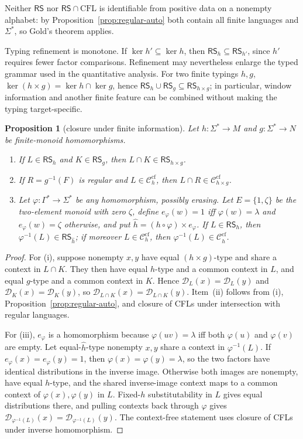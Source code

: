 \documentclass[11pt,a4paper]{article}
\newtheorem{proposition}[theorem]{Proposition}
\theoremstyle{remark}
\theoremstyle{plain}
\newcommand{\D}{\mathcal{D}}
\newcommand{\cf}{\mathrm{cf}}
\newcommand{\Ccf}[1]{\mathcal C_{#1}^{\cf}}
\begin{document}
Neither $\mathsf{RS}$ nor $\mathsf{RS}\cap\mathrm{CFL}$ is identifiable
from positive data on a nonempty alphabet: by
Proposition~\ref{prop:regular-auto} both contain all finite languages and
$\Sigma^*$, so Gold's theorem applies.

Typing refinement is monotone.  If $\ker h'\subseteq\ker h$, then
$\mathsf{RS}_h\subseteq\mathsf{RS}_{h'}$, since $h'$ requires fewer
factor comparisons.  Refinement may nevertheless enlarge the typed grammar
used in the quantitative analysis.  For two finite typings $h,g$,
$\ker(h\times g)=\ker h\cap\ker g$, hence
$\mathsf{RS}_h\cup\mathsf{RS}_g\subseteq\mathsf{RS}_{h\times g}$;
in particular, window information and another finite feature can be combined
without making the typing target-specific.

\begin{proposition}[closure under finite information]\label{prop:finite-info-closure}
Let $h:\Sigma^*\to M$ and $g:\Sigma^*\to N$ be finite-monoid
homomorphisms.
\begin{enumerate}[label=\textup{(\roman*)},nosep]
\item If $L\in\mathsf{RS}_h$ and $K\in\mathsf{RS}_g$, then
$L\cap K\in\mathsf{RS}_{h\times g}$.
\item If $R=g^{-1}(F)$ is regular and $L\in\Ccf{h}$, then
$L\cap R\in\Ccf{h\times g}$.
\item Let $\varphi:\Gamma^*\to\Sigma^*$ be any homomorphism, possibly
erasing.  Let $E=\{1,\zeta\}$ be the two-element monoid with zero
$\zeta$, define $e_\varphi(w)=1$ iff $\varphi(w)=\lambda$ and
$e_\varphi(w)=\zeta$ otherwise, and put
$\widehat h=(h\circ\varphi)\times e_\varphi$.
If $L\in\mathsf{RS}_h$, then
$\varphi^{-1}(L)\in\mathsf{RS}_{\widehat h}$; if moreover
$L\in\Ccf{h}$, then
$\varphi^{-1}(L)\in\Ccf{\widehat h}$.
\end{enumerate}
\end{proposition}

\begin{proof}
For (i), suppose nonempty $x,y$ have equal $(h\times g)$-type and share a
context in $L\cap K$.  They then have equal $h$-type and a common context in
$L$, and equal $g$-type and a common context in $K$.  Hence
$\D_L(x)=\D_L(y)$ and $\D_K(x)=\D_K(y)$, so
$\D_{L\cap K}(x)=\D_{L\cap K}(y)$.  Item~(ii) follows from (i),
Proposition~\ref{prop:regular-auto}, and closure of CFLs under intersection
with regular languages.

For (iii), $e_\varphi$ is a homomorphism because
$\varphi(uv)=\lambda$ iff both $\varphi(u)$ and $\varphi(v)$ are empty.
Let equal-$\widehat h$-type nonempty $x,y$ share a context in
$\varphi^{-1}(L)$.  If $e_\varphi(x)=e_\varphi(y)=1$, then
$\varphi(x)=\varphi(y)=\lambda$, so the two factors have identical
distributions in the inverse image.  Otherwise both images are nonempty,
have equal $h$-type, and the shared inverse-image context maps to a common
context of $\varphi(x),\varphi(y)$ in $L$.  Fixed-$h$ substitutability in
$L$ gives equal distributions there, and pulling contexts back through
$\varphi$ gives
$\D_{\varphi^{-1}(L)}(x)=\D_{\varphi^{-1}(L)}(y)$.
The context-free statement uses closure of CFLs under inverse homomorphism.
\end{proof}
\end{document}
